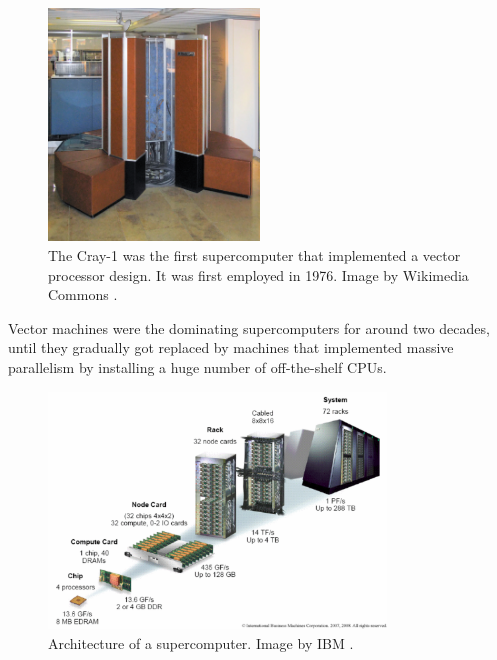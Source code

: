 \begin{figure}[tbp]
	\centering
	\includegraphics[width=0.5\textwidth]{chapters/chapter01/cray-1.jpg}
	\caption{The Cray-1 was the first supercomputer that implemented a vector processor design. It was first employed in 1976. Image by Wikimedia Commons \cite{wiki:cray_1_image}.} %
	\label{fig:cray_1}
\end{figure}

Vector machines were the dominating supercomputers for around two decades, until they gradually got replaced by machines that implemented massive parallelism by installing a huge number of off-the-shelf CPUs. 

\begin{figure}[tbp]
	\centering
	\includegraphics[width=0.8\textwidth]{architecture.png}
	\caption{Architecture of a supercomputer. Image by IBM \cite{image:supercomputer_arch}.} 
	\label{fig:finite_differences}
\end{figure}

